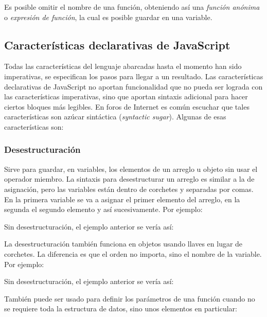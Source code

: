 \documentclass{article}
\newcommand{\codejs}[1]{\tcbox{\lstinline[style=ES6]{#1}}}
\newcommand{\jsfile}[2]{}
\begin{document}
Es posible omitir el nombre de una función, obteniendo así una \textit{función anónima} o \textit{expresión de función}, la cual es posible guardar en una variable.
\jsfile{Funciones anónimas}{code/functions/triple.js}


\subsection{Características declarativas de JavaScript}
Todas las características del lenguaje abarcadas hasta el momento han sido imperativas, se especifican los pasos para llegar a un resultado. Las características declarativas de JavaScript no aportan funcionalidad que no pueda ser lograda con las características imperativas, sino que aportan sintaxis adicional para hacer ciertos bloques más legibles. En foros de Internet es común escuchar que tales características son azúcar sintáctica (\textit{syntactic sugar}). Algunas de esas características son:

\subsubsection{Desestructuración}
Sirve para guardar, en variables, los elementos de un arreglo u objeto sin usar el operador miembro. La sintaxis para desestructurar un arreglo es similar a la de asignación, pero las variables están dentro de corchetes \codejs{[ ]} y separadas por comas. En la primera variable se va a asignar el primer elemento del arreglo, en la segunda el segundo elemento y así sucesivamente. Por ejemplo:
\jsfile{Asignar en variables los elementos de un arreglo usando desestructuración}{code/destructing/array-using-destructing.js}

Sin desestructuración, el ejemplo anterior se vería así:
\jsfile{Asignar en variables los elementos de un arreglo sin desestructuración}{code/destructing/array-using-member.js}

La desestructuración también funciona en objetos usando llaves \codejs{\{ \}} en lugar de corchetes. La diferencia es que el orden no importa, sino el nombre de la variable. Por ejemplo:
\jsfile{Asignar en variables los elementos de un objeto usando desestructuración}{code/destructing/object-using-destructing.js}

Sin desestructuración, el ejemplo anterior se vería así:
\jsfile{Asignar en variables los elementos de un objeto sin desestructuración}{code/destructing/object-using-member.js}

También puede ser usado para definir los parámetros de una función cuando no se requiere toda la estructura de datos, sino unos elementos en particular:
\jsfile{Desestructuración en los parámetros de una función}{code/destructing/functions.js}
\end{document}

